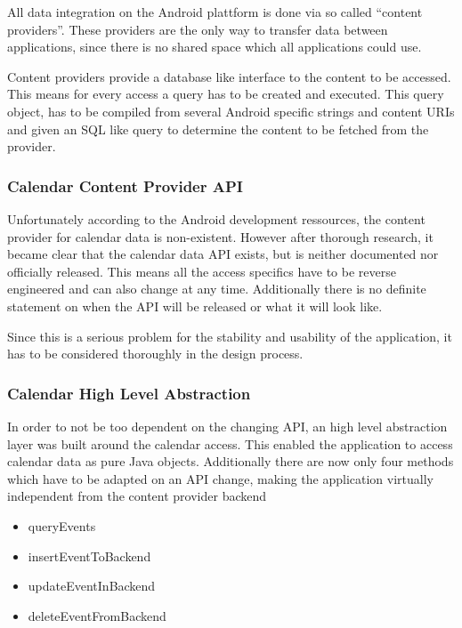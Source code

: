 All data integration on the Android plattform is done via
so called ``content providers''. These providers are the
only way to transfer data between applications, since there
is no shared space which all applications could use.

Content providers provide a database like interface to the content to be
accessed. This means for every access a query has to be created and executed.
This query object, has to be compiled from several Android specific strings and
content URIs and given an SQL like query to determine the content to be fetched
from the provider.

\subsubsection{Calendar Content Provider API} %
\label{ssub:Calendar Content Provider API}

Unfortunately according to the Android development ressources, the content
provider for calendar data is non-existent. However after thorough research, it
became clear that the calendar data API exists, but is neither documented nor
officially released. This means all the access specifics have to be reverse
engineered and can also change at any time. Additionally there is no definite
statement on when the API will be released or what it will look like.

Since this
is a serious problem for the stability and usability of the application, it has
to be considered thoroughly in the design process.


\subsubsection{Calendar High Level Abstraction} %
\label{ssub:Calendar High Level Abstraction}


In order to not be too dependent on the changing API, an high level abstraction
layer was built around the calendar access. This enabled the application to
access calendar data as pure Java objects.
Additionally there are now only four
methods which have to be adapted on an API change, making the application
virtually independent from the content provider backend

\begin{itemize}
  \item queryEvents
  \item insertEventToBackend
  \item updateEventInBackend
  \item deleteEventFromBackend
\end{itemize}

